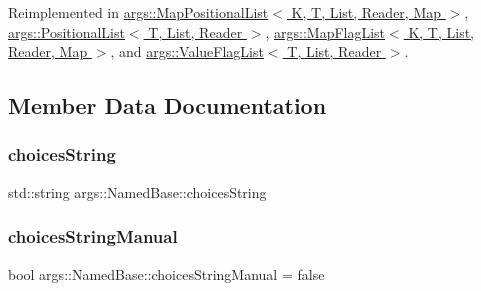 Reimplemented in \hyperlink{classargs_1_1_map_positional_list_a06d9cd19fea86e0027f2ab4a491f19bb}{args\+::\+Map\+Positional\+List$<$ K, T, List, Reader, Map $>$}, \hyperlink{classargs_1_1_positional_list_a5109dbd118c40b6cde570fa37acac950}{args\+::\+Positional\+List$<$ T, List, Reader $>$}, \hyperlink{classargs_1_1_map_flag_list_a1703584ba7b36c5e15aa375eae23903c}{args\+::\+Map\+Flag\+List$<$ K, T, List, Reader, Map $>$}, and \hyperlink{classargs_1_1_value_flag_list_ac0188f5bbc605c02edce2a91675d423c}{args\+::\+Value\+Flag\+List$<$ T, List, Reader $>$}.



\subsection{Member Data Documentation}
\mbox{\label{classargs_1_1_named_base_a2e1624c744d671916b0c943f8fbad962}} 
\subsubsection{\texorpdfstring{choices\+String}{choicesString}}
{\footnotesize\ttfamily std\+::string args\+::\+Named\+Base\+::choices\+String\hspace{0.3cm}{\ttfamily [protected]}}

\mbox{\label{classargs_1_1_named_base_afc180b62e1f2d9c194354b163f3410b6}} 
\subsubsection{\texorpdfstring{choices\+String\+Manual}{choicesStringManual}}
{\footnotesize\ttfamily bool args\+::\+Named\+Base\+::choices\+String\+Manual = false\hspace{0.3cm}{\ttfamily [protected]}}

\mbox{\label{classargs_1_1_named_base_a7460bf500a1873039fc741247a959ddc}} 
